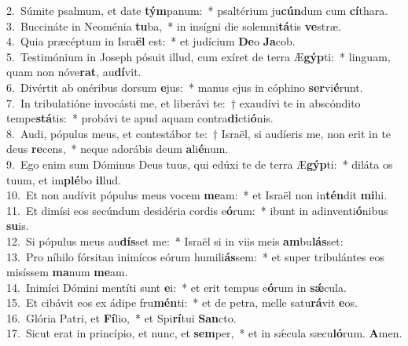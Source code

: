 {2.~}Súmite psalmum, et date \textbf{tým}panum:~* psaltérium ju\textbf{cún}dum cum \textbf{cí}thara.\\
{3.~}Buccináte in Neoménia \textbf{tu}ba,~* in insígni die solemni\textbf{tá}tis \textbf{ve}stræ.\\
{4.~}Quia præcéptum in Isra\textbf{ël} est:~* et judícium \textbf{De}o \textbf{Ja}cob.\\
{5.~}Testimónium in Joseph pósuit illud, cum exíret de terra Æ\textbf{gýp}ti:~* linguam, quam non nóve\textbf{rat}, au\textbf{dí}vit.\\
{6.~}Divértit ab onéribus dorsum \textbf{e}jus:~* manus ejus in cóphino \textbf{ser}vi\textbf{é}runt.\\
{7.~}In tribulatióne invocásti me, et liberávi te:~† exaudívi te in abscóndito tempe\textbf{stá}tis:~* probávi te apud aquam contra\textbf{di}cti\textbf{ó}nis.\\
{8.~}Audi, pópulus meus, et contestábor te:~† Israël, si audíeris me, non erit in te deus \textbf{re}cens,~* neque adorábis deum \textbf{a}li\textbf{é}num.\\
{9.~}Ego enim sum Dóminus Deus tuus, qui edúxi te de terra Æ\textbf{gýp}ti:~* diláta os tuum, et im\textbf{plé}bo \textbf{il}lud.\\
{10.~}Et non audívit pópulus meus vocem \textbf{me}am:~* et Israël non in\textbf{tén}dit \textbf{mi}hi.\\
{11.~}Et dimísi eos secúndum desidéria cordis e\textbf{ó}rum:~* ibunt in adinventi\textbf{ó}nibus \textbf{su}is.\\
{12.~}Si pópulus meus au\textbf{dís}set me:~* Israël si in viis meis \textbf{am}bu\textbf{lás}set:\\
{13.~}Pro níhilo fórsitan inimícos eórum humili\textbf{ás}sem:~* et super tribulántes eos misíssem \textbf{ma}num \textbf{me}am.\\
{14.~}Inimíci Dómini mentíti sunt \textbf{e}i:~* et erit tempus e\textbf{ó}rum in \textbf{sǽ}cula.\\
{15.~}Et cibávit eos ex ádipe fru\textbf{mén}ti:~* et de petra, melle satu\textbf{rá}vit \textbf{e}os.\\
{16.~}Glória Patri, et \textbf{Fí}lio,~* et Spi\textbf{rí}tui \textbf{San}cto.\\
{17.~}Sicut erat in princípio, et nunc, et \textbf{sem}per,~* et in sǽcula sæcu\textbf{ló}rum. \textbf{A}men.\\
